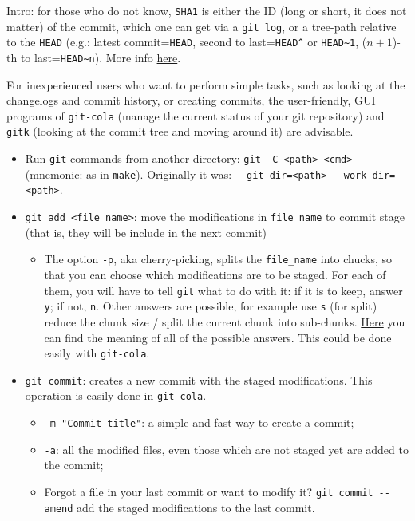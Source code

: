 \documentclass[a4paper,12pt,%
              final%
              ]{article}
\begin{document}
Intro: for those who do not know, \texttt{SHA1} is either the ID (long or short, it does not matter) of the commit, which one can get via a \texttt{git log}, or a tree-path relative to the \texttt{HEAD} (e.g.: latest commit=\texttt{HEAD}, second to last=\verb|HEAD^| or \verb|HEAD~1|, ($n+1$)-th to last=\verb|HEAD~n|). More info \href{https://git-scm.com/docs/git-cherry-pick}{here}.

For inexperienced users who want to perform simple tasks, such as looking at the changelogs and commit history, or creating commits, the user-friendly, GUI programs of \texttt{git-cola} (manage the current status of your git repository) and \texttt{gitk} (looking at the commit tree and moving around it) are advisable.
\begin{itemize}
  \item Run \verb|git| commands from another directory: \verb|git -C <path> <cmd>| (mnemonic: as in \verb|make|). Originally it was: \verb|--git-dir=<path> --work-dir=<path>|.
  \item \verb|git add <file_name>|: move the modifications in \verb|file_name| to commit stage (that is, they will be include in the next commit)
    \begin{itemize}
      \item The option \texttt{-p}, aka cherry-picking, splits the \verb|file_name| into chucks, so that you can choose which modifications are to be staged. For each of them, you will have to tell \texttt{git} what to do with it: if it is to keep, answer \texttt{y}; if not, \texttt{n}. Other answers are possible, for example use \texttt{s} (for split) reduce the chunk size / split the current chunk into sub-chunks. \href{https://stackoverflow.com/questions/1122210/can-i-modify-git-adds-hunk-size}{Here} you can find the meaning of all of the possible answers. This could be done easily with \texttt{git-cola}.
    \end{itemize}
  \item \texttt{git commit}: creates a new commit with the staged modifications. This operation is easily done in \texttt{git-cola}.
    \begin{itemize}
      \item \verb|-m "Commit title"|: a simple and fast way to create a commit;
      \item \texttt{-a}: all the modified files, even those which are not staged yet are added to the commit;
      \item Forgot a file in your last commit or want to modify it? \verb|git commit --amend| add the staged modifications to the last commit.

\end{itemize}
\end{itemize}
\end{document}
